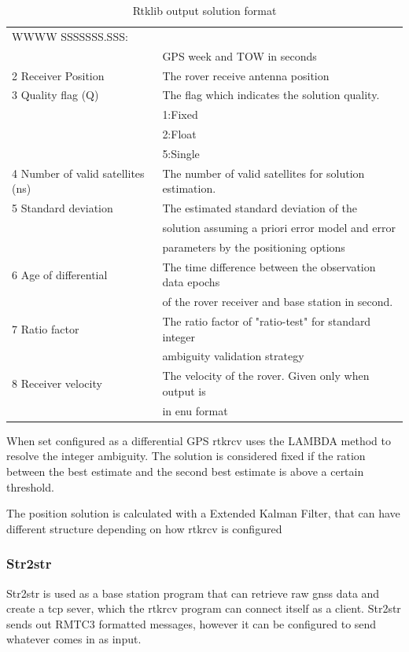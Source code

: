 \begin{table}[H]
\begin{center}
\begin{tabular}{ | l | l |}
     WWWW SSSSSSS.SSS:\\&
     GPS week and TOW in seconds  \\ \hline
     2 Receiver Position & The rover receive antenna position \\ \hline
     3 Quality flag (Q) & The flag which indicates the solution quality.\\& 1:Fixed\\& 2:Float\\& 5:Single \\ \hline
     4 Number of valid satellites (ns) & The number of valid satellites for solution estimation. \\ \hline
     5 Standard deviation & The estimated standard deviation of the\\& solution assuming a priori error model and error\\& parameters by the positioning options \\ \hline
     6 Age of differential & The time difference between the observation data epochs\\& of the rover receiver and base station in second. \\ \hline
     7 Ratio factor & The ratio factor of "ratio-test" for standard integer\\& ambiguity validation strategy \\ \hline
     8 Receiver velocity & The velocity of the rover. Given only when output is\\& in enu format \\ \hline
    \end{tabular}
\end{center}
\caption{Rtklib output solution format }
\label{Tb:RtklibOutput}
\end{table}
When set configured as a differential GPS rtkrcv uses the LAMBDA method to resolve the integer ambiguity. The solution is considered fixed if the ration between the best estimate and the second best estimate is above a certain threshold.

The position solution is calculated with a Extended Kalman Filter, that can have different structure depending on how rtkrcv is configured
\subsubsection{Str2str}
Str2str is used as a base station program that can retrieve raw \gls{gnss} data and create a tcp sever, which the rtkrcv program can connect itself as a client. Str2str sends out RMTC3 formatted messages, however it can be configured to send whatever comes in as input.
